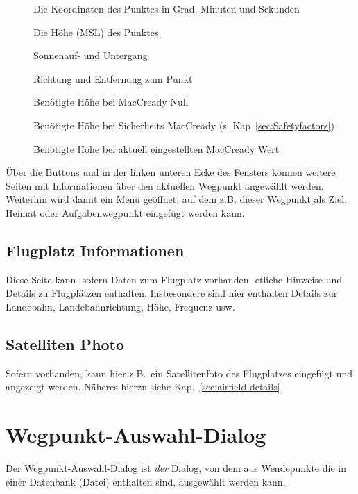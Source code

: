 \begin{description}
\item[] Die Koordinaten des Punktes in Grad, Minuten und Sekunden
\item[] Die Höhe (MSL) des Punktes
\item[] Sonnenauf- und Untergang
\item[] Richtung und Entfernung zum Punkt
\item[] Benötigte Höhe bei MacCready Null
\item[] Benötigte Höhe bei Sicherheits MacCready (s. Kap~\ref{sec:Safetyfactors})
\item[] Benötigte Höhe bei  aktuell eingestellten MacCready Wert
\end{description}

Über die Buttons \button{$<$} und \button{$>$} in der linken unteren Ecke des Fensters können weitere Seiten mit Informationen über den aktuellen Wegpunkt angewählt werden. Weiterhin wird damit ein Menü geöffnet, auf dem z.B. dieser Wegpunkt als Ziel, Heimat oder Aufgabenwegpunkt eingefügt werden kann.


\subsection*{Flugplatz Informationen}
Diese Seite kann -sofern Daten zum Flugplatz vorhanden- etliche Hinweise und Details zu Flugplätzen enthalten. 
Insbesondere sind hier enthalten Details zur Landebahn, Landebahnrichtung, Höhe, Frequenz usw.



\subsection*{Satelliten Photo}
Sofern vorhanden, kann hier z.B.\ ein Satellitenfoto des Flugplatzes eingefügt und angezeigt werden. 
Näheres hierzu siehe Kap.~\ref{sec:airfield-details} 




\section{Wegpunkt-Auswahl-Dialog}\label{sec:waypoint-selector-dialog}
Der Wegpunkt-Auswahl-Dialog ist \textsl{der} Dialog, von dem aus Wendepunkte die in einer Datenbank (Datei) enthalten sind, ausgewählt werden kann.

